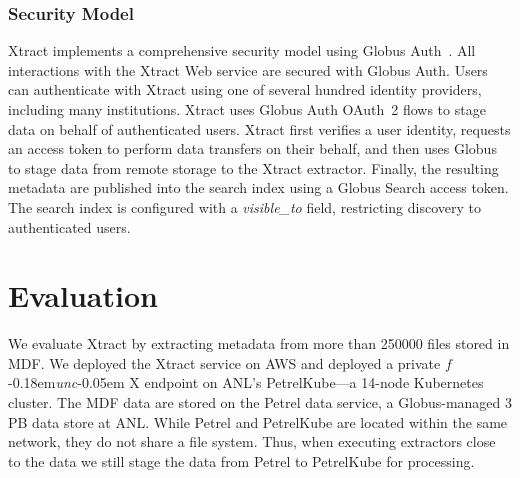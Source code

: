 \documentclass[sigconf]{acmart}
\newcommand{\name}{Xtract}
\newcommand{\funcx}{$f$\kern-0.18em\emph{unc}\kern-0.05em X}
\begin{document}
%


\subsubsection{Security Model}

\name{} implements a comprehensive security model using Globus Auth~\cite{tuecke2016globus}. 
All interactions with the \name{} Web service are secured with Globus Auth. 
Users can authenticate with \name{} using one of 
several hundred identity providers, including many institutions. 
\name{} uses Globus Auth OAuth~2 flows to stage data on behalf
of authenticated users. \name{} first verifies a user identity, requests an access
token to perform data transfers on their behalf, and then uses Globus to stage
data from remote storage to the \name{} extractor. 
Finally, the resulting metadata are published into the search index using a Globus Search
access token. The search index is configured with a \textit{visible\_to} field, restricting
discovery to authenticated users.


\section{Evaluation}
\label{sec:eval}
We evaluate \name{} by extracting metadata from 
more than \num{250000} files stored in MDF. 
We deployed the \name{} service on AWS and deployed a private \funcx{} endpoint on ANL's
PetrelKube---a 14-node Kubernetes cluster. 
The MDF data are stored on the Petrel data service, a Globus-managed 3 PB data store at ANL. 
While Petrel and PetrelKube are located within the same network, they do
not share a file system. Thus, when executing extractors close to the data 
we still stage the data from Petrel to PetrelKube for processing.
\end{document}
